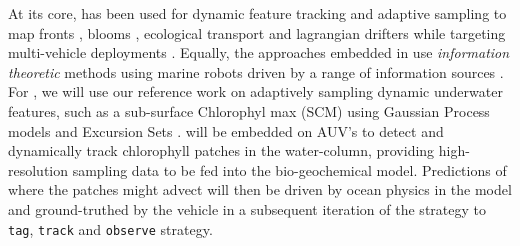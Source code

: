 At its core, \rx has been used for dynamic feature tracking and
adaptive sampling to map fronts \cite{fronts11,smith14}, blooms
\cite{Das-2010-637}, ecological transport \cite{jdas12,jdas13} and
lagrangian drifters \cite{das10,das11a} while targeting multi-vehicle
deployments \cite{das11,Ferreira2018,pinto20}. Equally, the approaches
embedded in \rx use \emph{information theoretic} methods using marine
robots driven by a range of information sources
\cite{Das-2010-637,fronts11,olaya12,jdas12,jdas13,das15,fossum18,fossum19,fossum19b,fossum21}.
For \proj, we will use our reference work on adaptively sampling
dynamic underwater features, such as a sub-surface Chlorophyl max
(SCM) using Gaussian Process models \cite{fossum19} and Excursion Sets
\cite{fossum21}. \rx will be embedded on AUV's to detect and
dynamically track chlorophyll patches in the water-column, providing
high-resolution sampling data to be fed into the bio-geochemical
model. Predictions of where the patches might advect will then be
driven by ocean physics in the model and ground-truthed by the vehicle
in a subsequent iteration of the strategy to \texttt{tag},
\texttt{track} and \texttt{observe} strategy.



